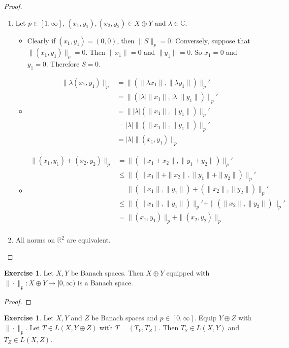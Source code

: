 \documentclass[12pt]{amsart}
\theoremstyle{definition}
\newtheorem{ex}[definition]{Exercise}
\newcommand{\lam}{\lambda}
\newcommand{\C}{\mathbb{C}}
\newcommand{\R}{\mathbb{R}}
\newcommand{\lex}[1]{\label{ex:#1}}
\begin{document}
	\begin{proof}\
	\begin{enumerate}
	\item Let $p \in [1, \infty]$, $(x_1,y_1), (x_2,y_2) \in X \oplus Y$ and $\lam \in \C$.
	\begin{itemize}
	\item Clearly if $(x_1, y_1) = (0,0)$, then $\|S\|_p = 0$. Conversely, suppose that $\|(x_1, y_1)\|_p = 0$. Then $\|x_1\| = 0$ and $\|y_1\| = 0$. So $x_1 = 0$ and $y_1 = 0$. Therefore $S = 0$. 
	\item 
	\begin{align*}
	\|\lam (x_1, y_1)\|_p
	&= \|(\|\lam x_1\|, \|\lam y_1\|)\|_p' \\
	&= \|(|\lam|\| x_1\|, |\lam|\|y_1 \|)\|_p' \\
	&= \||\lam| (\| x_1\|,\|y_1\| )\|_p' \\
	&= |\lam| \|(\| x_1\|,\|y_1\|)\|_p' \\
	&= |\lam| \| (x_1, y_1)\|_p
	\end{align*}
	\item 
	\begin{align*}
	\|(x_1, y_1) + (x_2, y_2)\|_p
	&= \|(\|x_1 + x_2\|, \|y_1 + y_2\|)\|_p' \\
	&\leq \|(\|x_1\| + \|x_2\|, \|y_1\| + \|y_2\|)\|_p' \\
	&= \|(\|x_1\|, \|y_1\|) + (\|x_2\|, \|y_2\|)\|_p' \\
	&\leq \|(\|x_1\|, \|y_1\|)\|_p' + \|(\|x_2\|, \|y_2\|)\|_p' \\
	&= \|(x_1, y_1)\|_p + \|(x_2, y_2)\|_p \\ 
	\end{align*}
	\end{itemize}
	\item All norms on $\R^2$ are equivalent.
	\end{enumerate}
\end{proof}		

\begin{ex} \lex{}	
	Let $X, Y$ be Banach spaces. Then $X \oplus Y$ equipped with $\|\cdot \|_p:X \oplus Y \rightarrow [0, \infty)$ is a Banach space. 
	\end{ex}
	
	\begin{proof}
	
	\end{proof}
	
	\begin{ex}
	Let $X, Y$ and $Z$ be Banach spaces and $p \in [0, \infty]$. Equip $Y \oplus Z$ with $\|\cdot\|_p$. Let $T \in L(X, Y \oplus Z)$ with $T = (T_Y, T_Z)$. Then $T_Y \in L(X, Y)$ and $T_Z \in L(X, Z)$.
	\end{ex}
	
\end{document}
